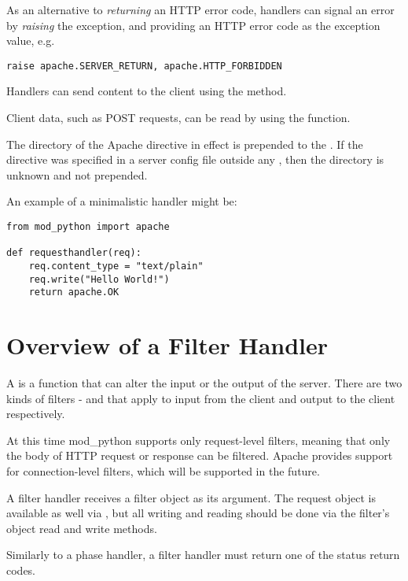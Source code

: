 As an alternative to \emph{returning} an HTTP error code, handlers can
signal an error by \emph{raising} the 
exception, and providing an HTTP error code as the exception value,
e.g.

\begin{verbatim}
raise apache.SERVER_RETURN, apache.HTTP_FORBIDDEN
\end{verbatim}
              
Handlers can send content to the client using the 
method. 

Client data, such as POST requests, can be read by using the
 function.

 The directory of the Apache  
directive in effect is prepended to the . If the
directive was specified in a server config file outside any
, then the directory is unknown and not prepended.

An example of a minimalistic handler might be: 

\begin{verbatim}
from mod_python import apache

def requesthandler(req):
    req.content_type = "text/plain"
    req.write("Hello World!")
    return apache.OK
\end{verbatim}

\section{Overview of a Filter Handler\label{pyapi-filter}}

A  is a function that can alter the input or the
output of the server. There are two kinds of filters -  and
 that apply to input from the client and output to the
client respectively.

At this time mod_python supports only request-level filters, meaning
that only the body of HTTP request or response can be filtered. Apache
provides support for connection-level filters, which will be supported
in the future.

A filter handler receives a filter object as its argument. The request
object is available as well via , but all writing and
reading should be done via the filter's object read and write methods.

Similarly to a phase handler, a filter handler must return one of the
status return codes.


